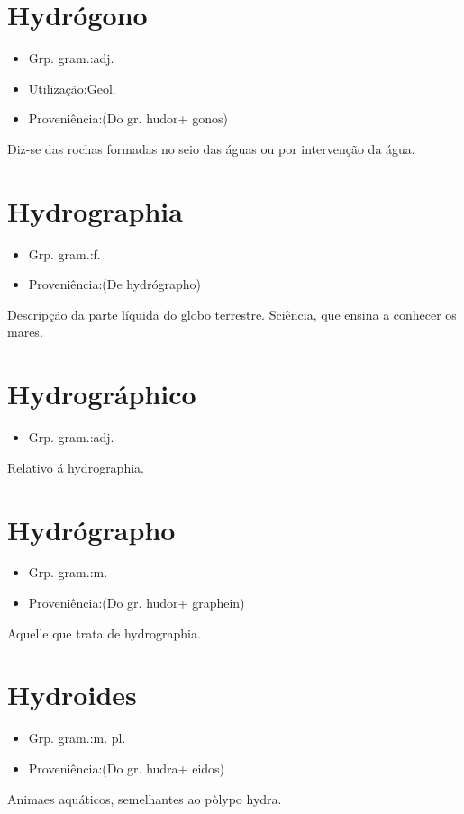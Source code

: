 \documentclass{article}
\begin{document}
\section{Hydrógono}
\begin{itemize}
\item {Grp. gram.:adj.}
\end{itemize}
\begin{itemize}
\item {Utilização:Geol.}
\end{itemize}
\begin{itemize}
\item {Proveniência:(Do gr. \textunderscore hudor\textunderscore  + \textunderscore gonos\textunderscore )}
\end{itemize}
Diz-se das rochas formadas no seio das águas ou por intervenção da água.
\section{Hydrographia}
\begin{itemize}
\item {Grp. gram.:f.}
\end{itemize}
\begin{itemize}
\item {Proveniência:(De \textunderscore hydrógrapho\textunderscore )}
\end{itemize}
Descripção da parte líquida do globo terrestre.
Sciência, que ensina a conhecer os mares.
\section{Hydrográphico}
\begin{itemize}
\item {Grp. gram.:adj.}
\end{itemize}
Relativo á hydrographia.
\section{Hydrógrapho}
\begin{itemize}
\item {Grp. gram.:m.}
\end{itemize}
\begin{itemize}
\item {Proveniência:(Do gr. \textunderscore hudor\textunderscore  + \textunderscore graphein\textunderscore )}
\end{itemize}
Aquelle que trata de hydrographia.
\section{Hydroides}
\begin{itemize}
\item {Grp. gram.:m. pl.}
\end{itemize}
\begin{itemize}
\item {Proveniência:(Do gr. \textunderscore hudra\textunderscore  + \textunderscore eidos\textunderscore )}
\end{itemize}
Animaes aquáticos, semelhantes ao pòlypo hydra.
\end{document}
